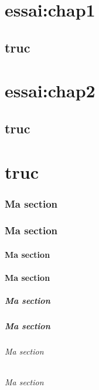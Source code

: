 \documentclass[bare]{polytech/polytech}
\begin{document}
\chapter{essai:chap1}
\label{essai:chap1}
      
\lipsum[1-4]
     
\section{truc}

\label{essai:chap1:sec}

\chapter*{essai:chap2}
\label{essai:chap2}
     
\lipsum[1-4]

\section{truc}

\label{essai:chap2:sec}

  
\chapter{truc}
\lipsum[1-20]         
 
\subsection{Ma section}
\lipsum[1-5]           

\subsection{Ma section}
\lipsum[1-5]
\subsubsection{Ma section}
\lipsum[1-5]
\subsubsection{Ma section}
\lipsum[1-5]
\paragraph{Ma section}
\lipsum[1-5]
\paragraph{Ma section}
\lipsum[1-5]
\subparagraph{Ma section}
\lipsum[1-5]
\subparagraph{Ma section}
\lipsum[1-5]
  
\end{document}

